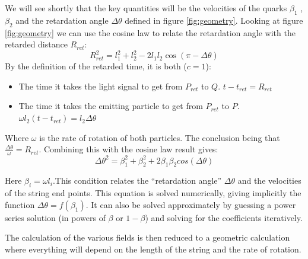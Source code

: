 \documentclass[11pt,a4paper]{article}
\begin{document}
We will see shortly that the key quantities will be the velocities of the quarks $\beta_1$ ,$\beta_2$ and  the retardation angle $\Delta\theta$ defined in figure \ref{fig:geometry}. Looking at figure \ref{fig:geometry} we can use the cosine law to relate the retardation angle with the retarded distance $R_{ret}$:
\begin{equation*}
R_{ret}^2=l_1^2+l_2^2-2l_1l_2\cos\left(\pi-\Delta\theta\right)
\end{equation*} 
By the definition of the retarded time, it is both ($c=1$):
\begin{itemize}
\item The time it takes the light signal to get from $P_{ret}$ to $Q$. $t-t_{ret}=R_{ret}$
\item The time it takes the emitting particle to get from $P_{ret}$ to $P$. $\omega l_2 \left(t-t_{ret}\right)=l_2\Delta\theta$
\end{itemize}
Where $\omega$ is the rate of rotation of both particles. The conclusion being that $\frac{\Delta\theta}{\omega}=R_{ret}$. Combining this with the cosine law result gives:
\begin{equation}
\label{eq:retardation}
\Delta\theta^{2}=\beta_{1}^{2}+\beta_{2}^{2}+2\beta_{1}\beta_{2}cos\left(\Delta\theta\right)
\end{equation}

Here $\beta_i=\omega l_i$.This condition relates the “retardation angle” $\Delta\theta$ and the velocities of the string end points. This equation is solved numerically, giving implicitly the function $\Delta\theta=f\left(\beta_{1}\right)$.
It can also be solved approximately by guessing a power series solution (in powers of $\beta $ or $1-\beta $) and solving for the coefficients iteratively.

The calculation of the various fields is then reduced to a geometric calculation where everything will depend on the length of the string and the rate of rotation.
\end{document}
